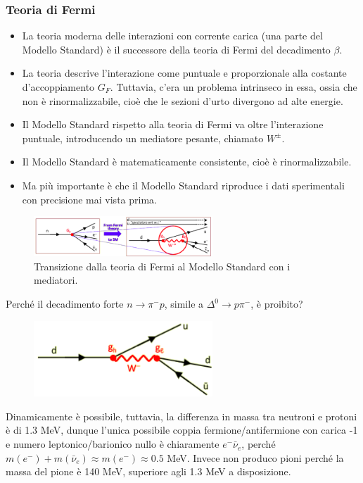 \subsubsection{Teoria di Fermi}
\begin{itemize}
    \item La teoria moderna delle interazioni con corrente carica (una parte del Modello Standard) è il successore della teoria di Fermi del decadimento $\beta$. 
    \item La teoria descrive l'interazione come puntuale e proporzionale alla costante d'accoppiamento $G_F$. Tuttavia, c'era un problema intrinseco in essa, ossia che non è rinormalizzabile, cioè che le sezioni d'urto divergono ad alte energie.
    \item Il Modello Standard rispetto alla teoria di Fermi va oltre l'interazione puntuale, introducendo un mediatore pesante, chiamato $W^\pm$.
    \item Il Modello Standard è matematicamente consistente, cioè è rinormalizzabile.
    \item Ma più importante è che il Modello Standard riproduce i dati sperimentali con precisione mai vista prima.
\end{itemize}
\begin{figure}[H]
    \centering
    \includegraphics[width=0.6\textwidth]{immagini/fig_fermi_to_ms.png}
    \caption{Transizione dalla teoria di Fermi al Modello Standard con i mediatori.}
\end{figure}
Perché il decadimento forte $n\to \pi^-p$, simile a $\Delta^0\to p\pi^-$, è proibito?
\begin{figure}[H]
    \centering
    \includegraphics[width=0.6\textwidth]{immagini/fig_n_p_pi.png}
\end{figure}
Dinamicamente è possibile, tuttavia, la differenza in massa tra neutroni e protoni è di 1.3 MeV, dunque l'unica possibile coppia fermione/antifermione con carica -1 e numero leptonico/barionico nullo è chiaramente $e^-\bar \nu_e$, perché $m(e^-)+m(\bar\nu_e)\approx m(e^-)\approx0.5$ MeV. Invece non produco pioni perché la massa del pione è 140 MeV, superiore agli 1.3 MeV a disposizione. 
